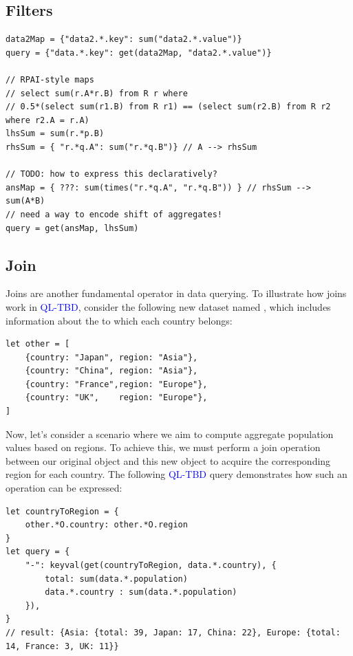 \documentclass[runningheads]{llncs}
\newcommand{\lang}{\textcolor{blue}{QL-TBD}}
\begin{document}
\subsection{Filters}

\begin{lstlisting}[style=JavaScript, columns=flexible]
data2Map = {"data2.*.key": sum("data2.*.value")}
query = {"data.*.key": get(data2Map, "data2.*.value")}

// RPAI-style maps
// select sum(r.A*r.B) from R r where 
// 0.5*(select sum(r1.B) from R r1) == (select sum(r2.B) from R r2 where r2.A = r.A)
lhsSum = sum(r.*p.B)
rhsSum = { "r.*q.A": sum("r.*q.B")} // A --> rhsSum

// TODO: how to express this declaratively?
ansMap = { ???: sum(times("r.*q.A", "r.*q.B")) } // rhsSum --> sum(A*B)
// need a way to encode shift of aggregates! 
query = get(ansMap, lhsSum)
\end{lstlisting}

\subsection{Join}
Joins are another fundamental operator in data querying.
To illustrate how joins work in \lang{}, consider the following
new dataset named , which includes information about the
 to which each country belongs:

\begin{lstlisting}[style=JavaScript, columns=flexible]
let other = [
    {country: "Japan", region: "Asia"},
    {country: "China", region: "Asia"},
    {country: "France",region: "Europe"},
    {country: "UK",    region: "Europe"},
]
\end{lstlisting}

Now, let's consider a scenario where we aim to compute aggregate population
values based on regions.
To achieve this, we must perform a join operation between our original
 object and this new  object to acquire the
corresponding region for each country.
The following \lang{} query demonstrates how such an operation can be
expressed:

\begin{lstlisting}[style=JavaScript, columns=flexible]
let countryToRegion = {
    other.*O.country: other.*O.region
}
let query = {
    "-": keyval(get(countryToRegion, data.*.country), {
        total: sum(data.*.population)
        data.*.country : sum(data.*.population)
    }),
}
// result: {Asia: {total: 39, Japan: 17, China: 22}, Europe: {total: 14, France: 3, UK: 11}}
\end{lstlisting}
\end{document}
